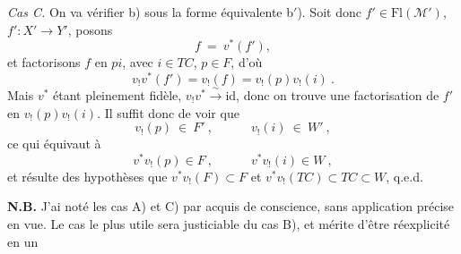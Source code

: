 \documentclass[11pt]{article}
\newcommand{\printedpage}[1]{\marginpar{\footnotesize p.~#1}}
\newcommand{\msp}[1]{\marginpar{\footnotesize [#1]}}
\newcommand{\M}{\mathcal{M}}
\newcommand{\Fl}{\mathrm{Fl}}
\begin{document}
\textit{Cas C.} On va vérifier b) sous la forme équivalente b$'$). Soit donc $f' \in \Fl(\M')$, $f' : X' \longrightarrow Y'$,
\printedpage{12}
\msp{page 19}
posons
\[
f\ =\ v^*(f'),
\]
et factorisons $f$ en $pi$, avec $i \in TC$, $p \in F$, d'où
\[
v_!v^*(f') = v_!(f) = v_!(p)v_!(i)\ .
\]
Mais $v^*$ étant pleinement fidèle, $v_!v^* \xrightarrow{\ \sim\ } \mathrm{id}$, donc on trouve une factorisation de $f'$ en $v_!(p)v_!(i)$. Il suffit donc de voir que
\[
v_!(p)\ \in\ F'\ ,\qquad\quad v_!(i)\ \in\ W'\ ,
\]
ce qui équivaut à
\[
v^*v_!(p) \in F\ ,\qquad\quad v^*v_!(i) \in W\ ,
\]
et résulte des hypothèses que $v^*v_!(F) \subset F$ et $v^*v_!(TC) \subset TC \subset W$, q.e.d.

\textbf{N.B.} J'ai noté les cas A) et C) par acquis de conscience, sans application précise en vue. Le cas le plus utile sera justiciable du cas B), et mérite d'être réexplicité en un
\end{document}
